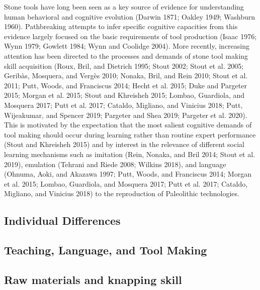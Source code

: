 \documentclass[smallextended]{svjour3}       %
\begin{document}
Stone tools have long been seen as a key source of evidence for
understanding human behavioral and cognitive evolution (Darwin 1871;
Oakley 1949; Washburn 1960). Pathbreaking attempts to infer specific
cognitive capacities from this evidence largely focused on the basic
requirements of tool production (Isaac 1976; Wynn 1979; Gowlett 1984;
Wynn and Coolidge 2004). More recently, increasing attention has been
directed to the processes and demands of stone tool making skill
acquisition (Roux, Bril, and Dietrich 1995; Stout 2002; Stout et al.
2005; Geribàs, Mosquera, and Vergès 2010; Nonaka, Bril, and Rein 2010;
Stout et al. 2011; Putt, Woods, and Franciscus 2014; Hecht et al. 2015;
Duke and Pargeter 2015; Morgan et al. 2015; Stout and Khreisheh 2015;
Lombao, Guardiola, and Mosquera 2017; Putt et al. 2017; Cataldo,
Migliano, and Vinicius 2018; Putt, Wijeakumar, and Spencer 2019;
Pargeter and Shea 2019; Pargeter et al. 2020). This is motivated by the
expectation that the most salient cognitive demands of tool making
should occur during learning rather than routine expert performance
(Stout and Khreisheh 2015) and by interest in the relevance of different
social learning mechanisms such as imitation (Rein, Nonaka, and Bril
2014; Stout et al. 2019), emulation (Tehrani and Riede 2008; Wilkins
2018), and language (Ohnuma, Aoki, and Akazawa 1997; Putt, Woods, and
Franciscus 2014; Morgan et al. 2015; Lombao, Guardiola, and Mosquera
2017; Putt et al. 2017; Cataldo, Migliano, and Vinicius 2018) to the
reproduction of Paleolithic technologies.

\hypertarget{individual-differences}{%
\subsection{\texorpdfstring{\textbf{Individual
Differences}}{Individual Differences}}\label{individual-differences}}

\hypertarget{teaching-language-and-tool-making}{%
\subsection{\texorpdfstring{\textbf{Teaching, Language, and Tool
Making}}{Teaching, Language, and Tool Making}}\label{teaching-language-and-tool-making}}

\hypertarget{raw-materials-and-knapping-skill}{%
\subsection{\texorpdfstring{\textbf{Raw materials and knapping
skill}}{Raw materials and knapping skill}}\label{raw-materials-and-knapping-skill}}
\end{document}
